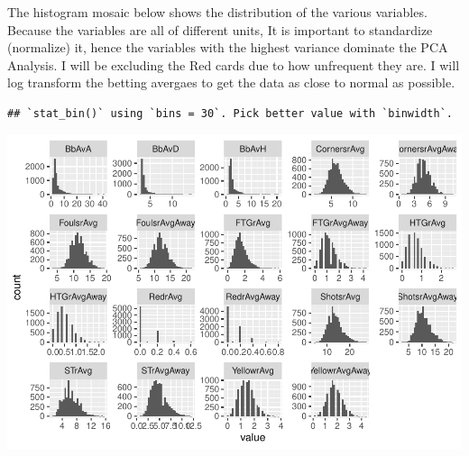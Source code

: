 \documentclass[
]{article}
\newenvironment{Shaded}{\begin{snugshade}}{\end{snugshade}}
\newcommand{\DataTypeTok}[1]{\textcolor[rgb]{0.13,0.29,0.53}{#1}}
\newcommand{\DecValTok}[1]{\textcolor[rgb]{0.00,0.00,0.81}{#1}}
\newcommand{\KeywordTok}[1]{\textcolor[rgb]{0.13,0.29,0.53}{\textbf{#1}}}
\newcommand{\NormalTok}[1]{#1}
\newcommand{\OperatorTok}[1]{\textcolor[rgb]{0.81,0.36,0.00}{\textbf{#1}}}
\newcommand{\StringTok}[1]{\textcolor[rgb]{0.31,0.60,0.02}{#1}}
\begin{document}
The histogram mosaic below shows the distribution of the various
variables. Because the variables are all of different units, It is
important to standardize (normalize) it, hence the variables with the
highest variance dominate the PCA Analysis. I will be excluding the Red
cards due to how unfrequent they are. I will log transform the betting
avergaes to get the data as close to normal as possible.

\begin{Shaded}
\end{Shaded}

\begin{verbatim}
## `stat_bin()` using `bins = 30`. Pick better value with `binwidth`.
\end{verbatim}

\begin{center}\includegraphics{EPL_Model_files/figure-latex/unnamed-chunk-6-1} \end{center}
\end{document}
